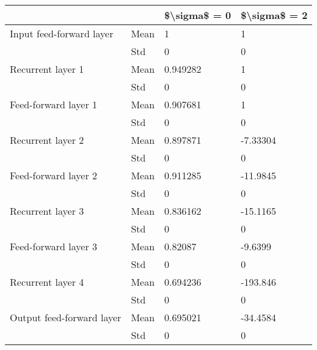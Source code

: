 \begin{tabular}{llll}
\toprule
                          &     & \$\textbackslash sigma\$  = 0 & \$\textbackslash sigma\$  = 2 \\
\midrule
Input feed-forward layer & Mean &             1 &             1 \\
                          & Std &             0 &             0 \\
Recurrent layer 1 & Mean &      0.949282 &             1 \\
                          & Std &             0 &             0 \\
Feed-forward layer 1 & Mean &      0.907681 &             1 \\
                          & Std &             0 &             0 \\
Recurrent layer 2 & Mean &      0.897871 &      -7.33304 \\
                          & Std &             0 &             0 \\
Feed-forward layer 2 & Mean &      0.911285 &      -11.9845 \\
                          & Std &             0 &             0 \\
Recurrent layer 3 & Mean &      0.836162 &      -15.1165 \\
                          & Std &             0 &             0 \\
Feed-forward layer 3 & Mean &       0.82087 &       -9.6399 \\
                          & Std &             0 &             0 \\
Recurrent layer 4 & Mean &      0.694236 &      -193.846 \\
                          & Std &             0 &             0 \\
Output feed-forward layer & Mean &      0.695021 &      -34.4584 \\
                          & Std &             0 &             0 \\
\bottomrule
\end{tabular}
